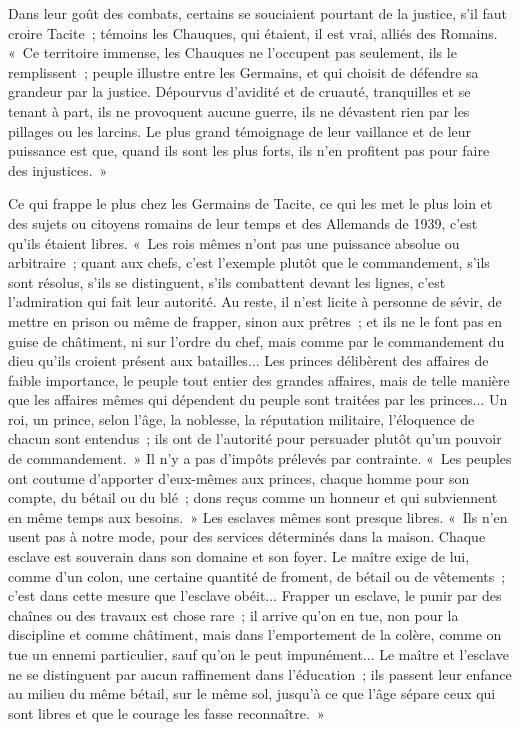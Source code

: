 \documentclass[french,twoside]{book} %
\begin{document}
Dans leur goût des combats, certains se souciaient pourtant de la justice, s'il faut croire Tacite ; témoins les Chauques, qui étaient, il est vrai, alliés des Romains. « Ce territoire immense, les Chauques ne l'occupent pas seulement, ils le remplissent ; peuple illustre entre les Germains, et qui choisit de défen­dre sa grandeur par la justice. Dépourvus d'avidité et de cruauté, tranquilles et se tenant à part, ils ne provoquent aucune guerre, ils ne dévastent rien par les pillages ou les larcins. Le plus grand témoignage de leur vaillance et de leur puissance est que, quand ils sont les plus forts, ils n'en profitent pas pour faire des injustices. »\par
Ce qui frappe le plus chez les Germains de Tacite, ce qui les met le plus loin et des sujets ou citoyens romains de leur temps et des Allemands de 1939, c'est qu'ils étaient libres. « Les rois mêmes n'ont pas une puissance absolue ou arbitraire ; quant aux chefs, c'est l'exemple plutôt que le commandement, s'ils sont résolus, s'ils se distinguent, s'ils combattent devant les lignes, c'est l'admiration qui fait leur autorité. Au reste, il n'est licite à personne de sévir, de mettre en prison ou même de frapper, sinon aux prêtres ; et ils ne le font pas en guise de châtiment, ni sur l'ordre du chef, mais comme par le comman­dement du dieu qu'ils croient présent aux batailles... Les princes délibèrent des affaires de faible importance, le peuple tout entier des grandes affaires, mais de telle manière que les affaires mêmes qui dépendent du peuple sont traitées par les princes... Un roi, un prince, selon l'âge, la noblesse, la réputation militaire, l'éloquence de chacun sont entendus ; ils ont de l'autorité pour persuader plutôt qu'un pouvoir de commandement. » Il n'y a pas d'impôts prélevés par contrainte. « Les peuples ont coutume d'apporter d'eux-mêmes aux princes, chaque homme pour son compte, du bétail ou du blé ; dons reçus comme un honneur et qui subviennent en même temps aux besoins. » Les esclaves mêmes sont presque libres. « Ils n'en usent pas à notre mode, pour des services déterminés dans la maison. Chaque esclave est souverain dans son domaine et son foyer. Le maître exige de lui, comme d'un colon, une cer­taine quantité de froment, de bétail ou de vêtements ; c'est dans cette mesure que l'esclave obéit... Frapper un esclave, le punir par des chaînes ou des travaux est chose rare ; il arrive qu'on en tue, non pour la discipline et comme châtiment, mais dans l'emportement de la colère, comme on tue un ennemi particulier, sauf qu'on le peut impunément... Le maître et l'esclave ne se distinguent par aucun raffinement dans l'éducation ; ils passent leur enfance au milieu du même bétail, sur le même sol, jusqu'à ce que l'âge sépare ceux qui sont libres et que le courage les fasse reconnaître. »\par
\end{document}
